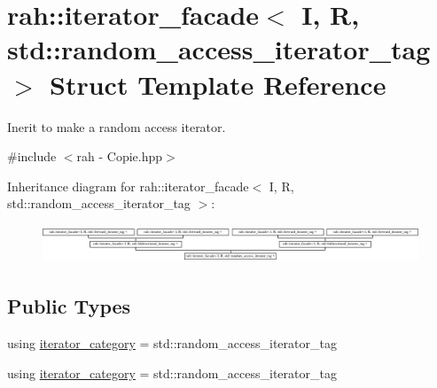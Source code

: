 \hypertarget{structrah_1_1iterator__facade_3_01_i_00_01_r_00_01std_1_1random__access__iterator__tag_01_4}{}\section{rah\+::iterator\+\_\+facade$<$ I, R, std\+::random\+\_\+access\+\_\+iterator\+\_\+tag $>$ Struct Template Reference}
\label{structrah_1_1iterator__facade_3_01_i_00_01_r_00_01std_1_1random__access__iterator__tag_01_4}


Inerit to make a random access iterator.  




{\ttfamily \#include $<$rah -\/ Copie.\+hpp$>$}

Inheritance diagram for rah\+::iterator\+\_\+facade$<$ I, R, std\+::random\+\_\+access\+\_\+iterator\+\_\+tag $>$\+:\begin{figure}[H]
\begin{center}
\leavevmode
\includegraphics[height=1.147541cm]{structrah_1_1iterator__facade_3_01_i_00_01_r_00_01std_1_1random__access__iterator__tag_01_4}
\end{center}
\end{figure}
\subsection*{Public Types}
\begin{DoxyCompactItemize}
\item 
using \mbox{\hyperlink{structrah_1_1iterator__facade_3_01_i_00_01_r_00_01std_1_1random__access__iterator__tag_01_4_a90e8ca56b8c64c3342bcfbc722931cc5}{iterator\+\_\+category}} = std\+::random\+\_\+access\+\_\+iterator\+\_\+tag
\item 
using \mbox{\hyperlink{structrah_1_1iterator__facade_3_01_i_00_01_r_00_01std_1_1random__access__iterator__tag_01_4_a90e8ca56b8c64c3342bcfbc722931cc5}{iterator\+\_\+category}} = std\+::random\+\_\+access\+\_\+iterator\+\_\+tag
\end{DoxyCompactItemize}
